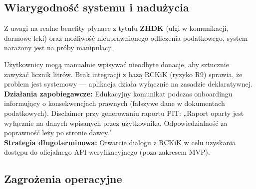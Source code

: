 \documentclass[11pt, a4paper]{article}
\newcommand{\term}[1]{\textbf{#1}}
\begin{document}
\subsection{Wiarygodność systemu i nadużycia}

Z uwagi na realne benefity płynące z tytułu \term{ZHDK} (ulgi w komunikacji, darmowe leki) oraz możliwość nieuprawnionego odliczenia podatkowego, system narażony jest na próby manipulacji.

\begin{description}[leftmargin=0pt]
    \item[\term{Fałszowanie historii donacji — ryzyko R6 (P=4, W=5):}]
    Użytkownicy mogą manualnie wpisywać nieodbyte donacje, aby sztucznie zawyżać licznik litrów. Brak integracji z bazą RCKiK (ryzyko R9) sprawia, że problem jest systemowy — aplikacja działa wyłącznie na zasadzie deklaratywnej. \\
    \textbf{Działania zapobiegawcze:} Edukacyjny komunikat podczas onboardingu informujący o konsekwencjach prawnych (fałszywe dane w dokumentach podatkowych). Disclaimer przy generowaniu raportu PIT: „Raport oparty jest wyłącznie na danych wpisanych przez użytkownika. Odpowiedzialność za poprawność leży po stronie dawcy." \\
    \textbf{Strategia długoterminowa:} Otwarcie dialogu z RCKiK w celu uzyskania dostępu do oficjalnego API weryfikacyjnego (poza zakresem MVP).

    
\end{description}

\subsection{Zagrożenia operacyjne}
\end{document}

